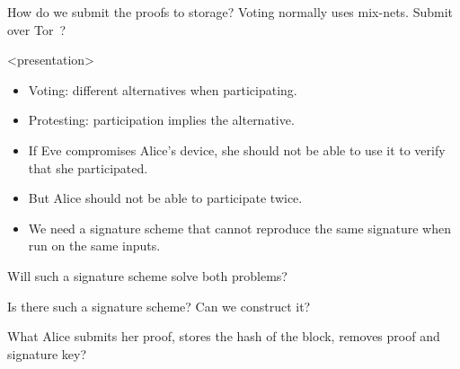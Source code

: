 \begin{frame}
  \begin{question}
    How do we submit the proofs to storage?
    Voting normally uses mix-nets.
    Submit over Tor~\cite{Tor}?
  \end{question}

\end{frame}

\begin{frame}<presentation>
  \begin{remark}
    \begin{itemize}
      \item Voting: different alternatives when participating.
      \item Protesting: participation implies the alternative.
    \end{itemize}
  \end{remark}

  \pause

  \begin{idea}
    \begin{itemize}
      \item If Eve compromises Alice's device, she should not be able to use 
        it to verify that she participated.

      \item But Alice should not be able to participate twice.

      \item We need a signature scheme that cannot reproduce the same 
        signature when run on the same inputs.
    \end{itemize}
  \end{idea}
\end{frame}

\begin{frame}
  \begin{question}
    Will such a signature scheme solve both problems?
  \end{question}
  \begin{question}
    Is there such a signature scheme?
    Can we construct it?
  \end{question}
  \begin{question}
    What Alice submits her proof, stores the hash of the block, removes proof 
    and signature key?
  \end{question}
\end{frame}

